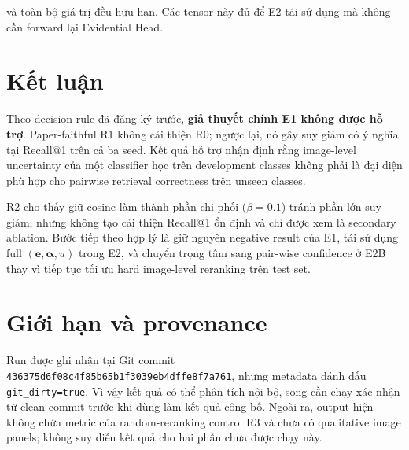 \documentclass[11pt,a4paper]{article}
\begin{document}
và toàn bộ giá trị đều hữu hạn. Các tensor này đủ để E2 tái sử dụng mà
không cần forward lại Evidential Head.

\section{Kết luận}

Theo decision rule đã đăng ký trước, \textbf{giả thuyết chính E1 không
được hỗ trợ}. Paper-faithful R1 không cải thiện R0; ngược lại, nó gây suy
giảm có ý nghĩa tại Recall@1 trên cả ba seed. Kết quả hỗ trợ nhận định rằng
image-level uncertainty của một classifier học trên development classes
không phải là đại diện phù hợp cho pairwise retrieval correctness trên
unseen classes.

R2 cho thấy giữ cosine làm thành phần chi phối ($\beta=0.1$) tránh phần
lớn suy giảm, nhưng không tạo cải thiện Recall@1 ổn định và chỉ được xem
là secondary ablation. Bước tiếp theo hợp lý là giữ nguyên negative result
của E1, tái sử dụng full $(\mathbf e,\boldsymbol\alpha,u)$ trong E2,
và chuyển trọng tâm sang pair-wise confidence ở E2B thay vì tiếp tục
tối ưu hard image-level reranking trên test set.

\section{Giới hạn và provenance}

Run được ghi nhận tại Git commit
\texttt{436375d6f08c4f85b65b1f3039eb4dffe8f7a761}, nhưng metadata đánh
dấu \texttt{git\_dirty=true}. Vì vậy kết quả có thể phân tích nội bộ,
song cần chạy xác nhận từ clean commit trước khi dùng làm kết quả công bố.
Ngoài ra, output hiện không chứa metric của random-reranking control R3
và chưa có qualitative image panels; không suy diễn kết quả cho hai phần
chưa được chạy này.
\end{document}
